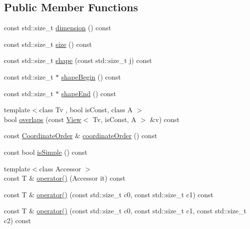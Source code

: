 \subsection*{Public Member Functions}
\begin{DoxyCompactItemize}
\item 
const std\+::size\+\_\+t \hyperlink{classandres_1_1ViewExpression_a93b140494015c1b01455083aaad98d15}{dimension} () const 
\item 
const std\+::size\+\_\+t \hyperlink{classandres_1_1ViewExpression_abc822f7af9444b7f59a8fd08d84cefb8}{size} () const 
\item 
const std\+::size\+\_\+t \hyperlink{classandres_1_1ViewExpression_a1cf03409893f5b7386a9458e9c8e1d9b}{shape} (const std\+::size\+\_\+t j) const 
\item 
const std\+::size\+\_\+t $\ast$ \hyperlink{classandres_1_1ViewExpression_a84e6e19c4523d47747e5c21c261c80c7}{shape\+Begin} () const 
\item 
const std\+::size\+\_\+t $\ast$ \hyperlink{classandres_1_1ViewExpression_aba3a1565372cdf4c99ca76c860e087aa}{shape\+End} () const 
\item 
{\footnotesize template$<$class Tv , bool is\+Const, class A $>$ }\\bool \hyperlink{classandres_1_1ViewExpression_ac06ec98e7837bc72c87ef5c9881ad19f}{overlaps} (const \hyperlink{classandres_1_1View}{View}$<$ Tv, is\+Const, A $>$ \&v) const 
\item 
const \hyperlink{namespaceandres_a2ac8b7aa89d44e8188a7c0ba50f4306b}{Coordinate\+Order} \& \hyperlink{classandres_1_1ViewExpression_a7936210ed21025b77e35c9a6f4f40619}{coordinate\+Order} () const 
\item 
const bool \hyperlink{classandres_1_1ViewExpression_ad4b49fe44d502e48c0286c01d23d28d8}{is\+Simple} () const 
\item 
{\footnotesize template$<$class Accessor $>$ }\\const T \& \hyperlink{classandres_1_1ViewExpression_a40e69cbc4391f7acf38f2d2e827c7d9c}{operator()} (Accessor it) const 
\item 
const T \& \hyperlink{classandres_1_1ViewExpression_a6cc016c4b3fc5c7b635d3fe4ad1a0c4c}{operator()} (const std\+::size\+\_\+t c0, const std\+::size\+\_\+t c1) const 
\item 
const T \& \hyperlink{classandres_1_1ViewExpression_acee883b8b06c7f739a1d584efe2d183f}{operator()} (const std\+::size\+\_\+t c0, const std\+::size\+\_\+t c1, const std\+::size\+\_\+t c2) const 
\item 

\end{DoxyCompactItemize}

